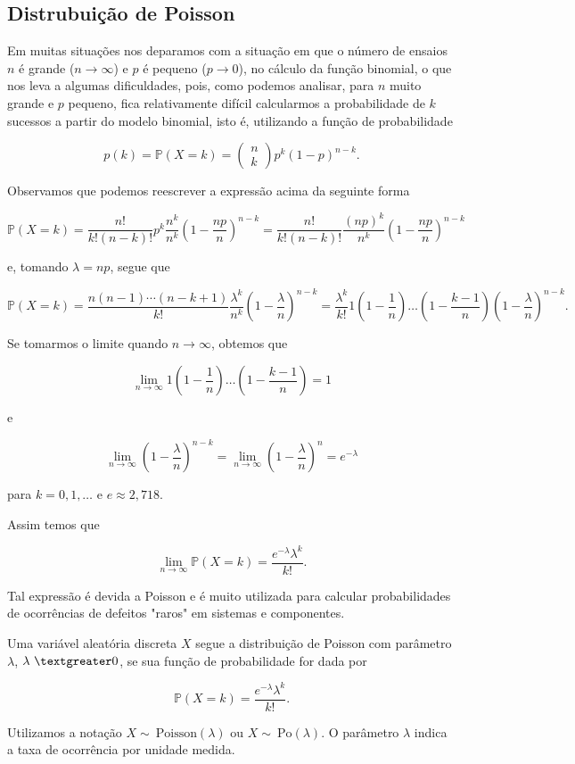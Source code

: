 \documentclass[10pt,a4paper]{article}
\begin{document}
\subsection{Distrubuição de Poisson}
Em muitas situações nos deparamos com a situação em que o número de ensaios $ n $ é grande ($ n\rightarrow \infty $) e $ p $ é pequeno ($ p\rightarrow 0 $), no cálculo da função binomial, o que nos leva a algumas dificuldades, pois, como podemos analisar, para $ n $ muito grande e $ p $ pequeno, fica relativamente difícil calcularmos a probabilidade de $ k $ sucessos a partir do modelo binomial, isto é, utilizando a função de probabilidade

\[p(k)=\mathbb{P}(X=k)=\left(\begin{array}{c}n\\k\end{array}\right)p^k(1-p)^{n-k}.\] 	

Observamos que podemos reescrever a expressão acima da seguinte forma

\[\mathbb{P}(X=k)=\frac{n!}{k!(n-k)!}p^k\frac{n^k}{n^k}\left(1-\frac{np}{n}\right)^{n-k}=\frac{n!}{k!(n-k)!}\frac{(np)^k}{n^k}\left(1-\frac{np}{n}\right)^{n-k}\] 	

e, tomando $ \lambda = np $, segue que

\[\mathbb{P}(X = k)=\frac{n(n-1)\cdots(n-k+1)}{k!}\frac{\lambda^k}{n^k}\left(1-\frac{\lambda}{n}\right)^{n-k}=\frac{\lambda^k}{k!}1\left(1-\frac{1}{n}\right)\dots\left(1-\frac{k-1}{n}\right)\left(1-\frac{\lambda}{n}\right)^{n-k}.\] 	

Se tomarmos o limite quando $ n\rightarrow \infty $, obtemos que

\[\lim_{n\rightarrow \infty}1\left(1-\frac{1}{n}\right)\dots\left(1-\frac{k-1}{n}\right)=1\] 	

e

\[\lim_{n\rightarrow \infty}\left(1-\frac{\lambda}{n}\right)^{n-k}=\lim_{n\rightarrow \infty}\left(1-\frac{\lambda}{n}\right)^{n}=e^{-\lambda}\] 	

para $ k = 0,1,\ldots $ e $ e\approx 2,718 $.

Assim temos que 

\[\lim_{n\rightarrow \infty}\mathbb{P}(X=k)=\frac{e^{-\lambda}\lambda^k}{k!}.\] 	

Tal expressão é devida a Poisson e é muito utilizada para calcular probabilidades de ocorrências de defeitos "raros" em sistemas e componentes.

\begin{df}
	Uma variável aleatória discreta $ X $ segue a distribuição de Poisson com parâmetro $ \lambda $, $ \lambda \ \textgreater 0 $, se sua função de probabilidade for dada por

	\[\mathbb{P}(X=k)=\frac{e^{-\lambda}\lambda^k}{k!}.\] 	

	Utilizamos a notação $ X \sim \ \text{Poisson}(\lambda) $ ou $ X\sim \ \text{Po}(\lambda) $. O parâmetro $ \lambda $ indica a taxa de ocorrência por unidade medida.
\end{df}
\end{document}
